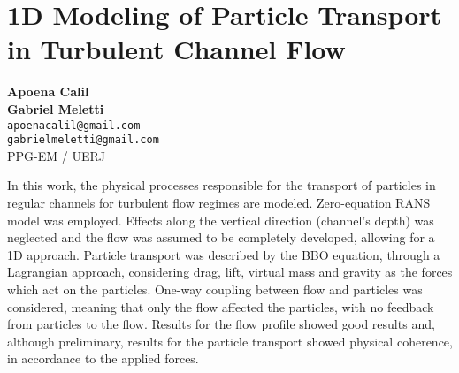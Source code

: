 
\section{1D Modeling of Particle Transport in Turbulent Channel Flow}

\textbf{Apoena Calil\\Gabriel Meletti}\\
\texttt{\small{apoenacalil@gmail.com\\gabrielmeletti@gmail.com}}\\
PPG-EM / UERJ

In this work, the physical processes responsible for the transport of particles in regular channels for turbulent flow regimes are modeled. Zero-equation RANS model was employed. Effects along the vertical direction (channel's depth) was neglected and the flow was assumed to be completely developed, allowing for a 1D approach. Particle transport was described by the BBO equation, through a Lagrangian approach, considering drag, lift, virtual mass and gravity as the forces which act on the particles. One-way coupling between flow and particles was considered, meaning that only the flow affected the particles, with no feedback from particles to the flow. Results for the flow profile showed good results and, although preliminary, results for the particle transport showed physical coherence, in accordance to the applied forces.


